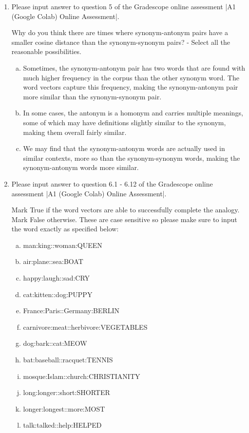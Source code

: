\begin{enumerate}[1.]
\item {}

Please input answer to question 5 of the Gradescope online assessment |A1 (Google Colab) Online Assessment|.

Why do you think there are times where synonym-antonym pairs have a smaller cosine distance than the synonym-synonym pairs? - Select all the reasonable possibilities.

\begin{enumerate}[a.]
\item Sometimes, the synonym-antonym pair has two words that are found with much higher frequency in the corpus than the other synonym word. The word vectors capture this frequency, making the synonym-antonym pair more similar than the synonym-synonym pair.

\item In some cases, the antonym is a homonym and carries multiple meanings, some of which may have definitions slightly similar to the synonym, making them overall fairly similar.

\item We may find that the synonym-antonym words are actually used in similar contexts, more so than the synonym-synonym words, making the synonym-antonym words more similar.
\end{enumerate}

\item {}

Please input answer to question 6.1 - 6.12 of the Gradescope online assessment |A1 (Google Colab) Online Assessment|.

Mark True if the word vectors are able to successfully complete the analogy. Mark False otherwise. These are case sensitive so please make sure to input the word exactly as specified below:

\begin{enumerate}[a.]
\item \textsf{man:king::woman:QUEEN}
\item \textsf{air:plane::sea:BOAT}
\item \textsf{happy:laugh::sad:CRY} %
\item \textsf{cat:kitten::dog:PUPPY}
\item \textsf{France:Paris::Germany:BERLIN}
\item \textsf{carnivore:meat::herbivore:VEGETABLES} %
\item \textsf{dog:bark::cat:MEOW} %
\item \textsf{bat:baseball::racquet:TENNIS}
\item \textsf{mosque:Islam::church:CHRISTIANITY}
\item \textsf{long:longer::short:SHORTER}
\item \textsf{longer:longest::more:MOST}
\item \textsf{talk:talked::help:HELPED}
\end{enumerate}


\end{enumerate}

